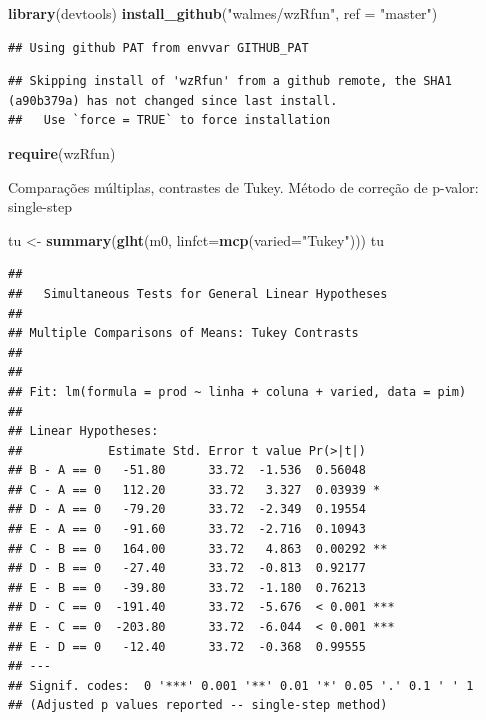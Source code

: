 \documentclass[
]{book}
\newenvironment{Shaded}{\begin{snugshade}}{\end{snugshade}}
\newcommand{\DataTypeTok}[1]{\textcolor[rgb]{0.13,0.29,0.53}{#1}}
\newcommand{\KeywordTok}[1]{\textcolor[rgb]{0.13,0.29,0.53}{\textbf{#1}}}
\newcommand{\NormalTok}[1]{#1}
\newcommand{\StringTok}[1]{\textcolor[rgb]{0.31,0.60,0.02}{#1}}
\begin{document}
\begin{Shaded}
\begin{Highlighting}[]
\KeywordTok{library}\NormalTok{(devtools) }
\KeywordTok{install_github}\NormalTok{(}\StringTok{"walmes/wzRfun"}\NormalTok{, }\DataTypeTok{ref =} \StringTok{"master"}\NormalTok{) }
\end{Highlighting}
\end{Shaded}

\begin{verbatim}
## Using github PAT from envvar GITHUB_PAT
\end{verbatim}

\begin{verbatim}
## Skipping install of 'wzRfun' from a github remote, the SHA1 (a90b379a) has not changed since last install.
##   Use `force = TRUE` to force installation
\end{verbatim}

\begin{Shaded}
\begin{Highlighting}[]
\KeywordTok{require}\NormalTok{(wzRfun)}
\end{Highlighting}
\end{Shaded}

Comparações múltiplas, contrastes de Tukey. Método de correção de p-valor: single-step

\begin{Shaded}
\begin{Highlighting}[]
\NormalTok{tu <-}\StringTok{ }\KeywordTok{summary}\NormalTok{(}\KeywordTok{glht}\NormalTok{(m0, }\DataTypeTok{linfct=}\KeywordTok{mcp}\NormalTok{(}\DataTypeTok{varied=}\StringTok{"Tukey"}\NormalTok{))) }
\NormalTok{tu}
\end{Highlighting}
\end{Shaded}

\begin{verbatim}
## 
##   Simultaneous Tests for General Linear Hypotheses
## 
## Multiple Comparisons of Means: Tukey Contrasts
## 
## 
## Fit: lm(formula = prod ~ linha + coluna + varied, data = pim)
## 
## Linear Hypotheses:
##            Estimate Std. Error t value Pr(>|t|)    
## B - A == 0   -51.80      33.72  -1.536  0.56048    
## C - A == 0   112.20      33.72   3.327  0.03939 *  
## D - A == 0   -79.20      33.72  -2.349  0.19554    
## E - A == 0   -91.60      33.72  -2.716  0.10943    
## C - B == 0   164.00      33.72   4.863  0.00292 ** 
## D - B == 0   -27.40      33.72  -0.813  0.92177    
## E - B == 0   -39.80      33.72  -1.180  0.76213    
## D - C == 0  -191.40      33.72  -5.676  < 0.001 ***
## E - C == 0  -203.80      33.72  -6.044  < 0.001 ***
## E - D == 0   -12.40      33.72  -0.368  0.99555    
## ---
## Signif. codes:  0 '***' 0.001 '**' 0.01 '*' 0.05 '.' 0.1 ' ' 1
## (Adjusted p values reported -- single-step method)
\end{verbatim}
\end{document}
